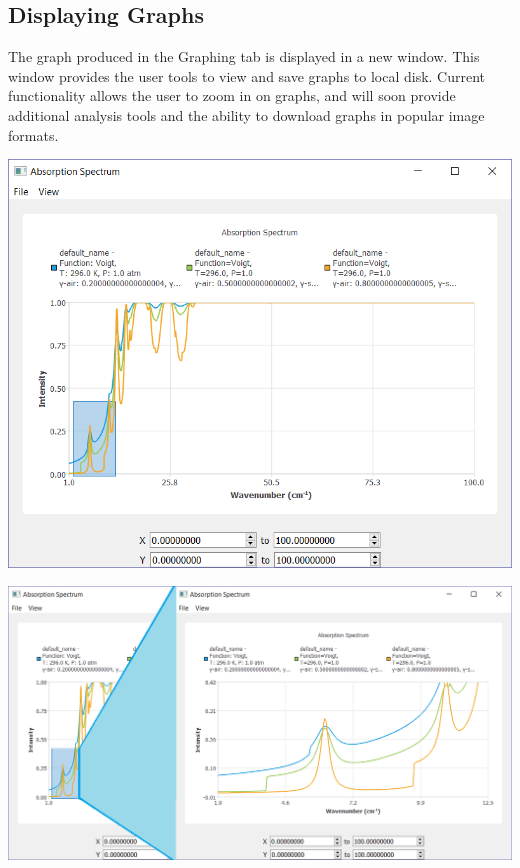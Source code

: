 \documentclass[a0,landscape]{a0poster}
\begin{document}
\begin{multicols}{3}
\subsection*{Displaying Graphs}
The graph produced in the Graphing tab is displayed in a new window. This window provides the user tools to view and save graphs to local disk. Current functionality allows the user to zoom in on graphs, and will soon provide additional analysis tools and the ability to download graphs in popular image formats. 
\begin{center}
\includegraphics[scale = 1.5]{GraphSelect.png}
\end{center}
\begin{center}
\includegraphics[scale = 1.2]{GraphDemo.png}
\end{center}



\end{multicols}
\end{document}

